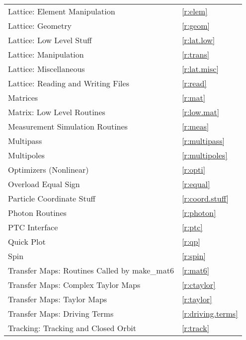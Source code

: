 \begin{center}
\begin{tabular}{ll}
  Lattice: Element Manipulation               & \ref{r:elem}           \\
  Lattice: Geometry                           & \ref{r:geom}           \\
  Lattice: Low Level Stuff                    & \ref{r:lat.low}        \\
  Lattice: Manipulation                       & \ref{r:trans}          \\
  Lattice: Miscellaneous                      & \ref{r:lat.misc}       \\
  Lattice: Reading and Writing Files          & \ref{r:read}           \\
  Matrices                                    & \ref{r:mat}            \\
  Matrix: Low Level Routines                  & \ref{r:low.mat}        \\
  Measurement Simulation Routines             & \ref{r:meas}           \\
  Multipass                                   & \ref{r:multipass}      \\
  Multipoles                                  & \ref{r:multipoles}     \\
  Optimizers (Nonlinear)                      & \ref{r:opti}           \\
  Overload Equal Sign                         & \ref{r:equal}          \\
  Particle Coordinate Stuff                   & \ref{r:coord.stuff}    \\
  Photon Routines                             & \ref{r:photon}         \\
  PTC Interface                               & \ref{r:ptc}            \\
  Quick Plot                                  & \ref{r:qp}             \\
  Spin                                        & \ref{r:spin}           \\
  Transfer Maps: Routines Called by make_mat6 & \ref{r:mat6}           \\
  Transfer Maps: Complex Taylor Maps          & \ref{r:ctaylor}        \\
  Transfer Maps: Taylor Maps                  & \ref{r:taylor}         \\
  Transfer Maps: Driving Terms                & \ref{r:driving.terms}  \\
  Tracking: Tracking and Closed Orbit         & \ref{r:track}          \\

\end{tabular}
\end{center}
